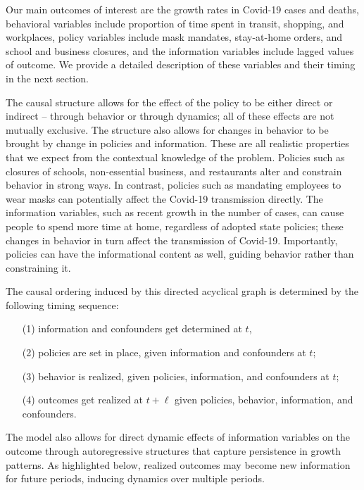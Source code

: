 \documentclass[3p, longtitle]{elsarticle}
\theoremstyle{definition}
\begin{document}
Our main outcomes of interest are the growth rates in Covid-19 cases and deaths,  behavioral variables include proportion of time spent in transit, shopping, and workplaces, policy variables include mask mandates, stay-at-home orders, and school and business closures, and the information variables include lagged values of outcome. We provide a detailed description of these variables and their timing in the next section.


The causal structure  allows for  the effect of the policy to be either direct or indirect -- through behavior or through dynamics;  all of these effects are not mutually exclusive. The structure also allows for changes in behavior to be brought by change in policies and information. These are all realistic properties that we expect from the contextual knowledge of the problem. Policies such as closures of schools, non-essential business, and restaurants alter and constrain behavior in strong ways.  In contrast, policies such as mandating employees to wear masks can potentially affect the Covid-19 transmission directly.  The information variables, such as recent growth in the number of cases, can cause people to spend more time at home, regardless of adopted state policies; these changes in behavior in turn affect the transmission of Covid-19.  Importantly, policies can have the informational content as well, guiding behavior rather than constraining it.

The causal ordering induced by this directed acyclical graph is determined by the following
timing sequence: %
\begin{itemize}
\item[(1)]  information and confounders get determined at $t$,
\item[(2)] policies are set in place, given information and confounders at $t$;
\item[(3)] behavior is realized, given policies, information, and confounders at $t$;
\item[(4)] outcomes get realized at $t+\ell$ given policies, behavior, information, and confounders.
\end{itemize}

The model also allows for direct dynamic effects of information variables on the outcome through autoregressive structures that capture persistence in growth patterns. As  highlighted below, realized outcomes may become new information for future periods, inducing dynamics over multiple periods.
\end{document}
